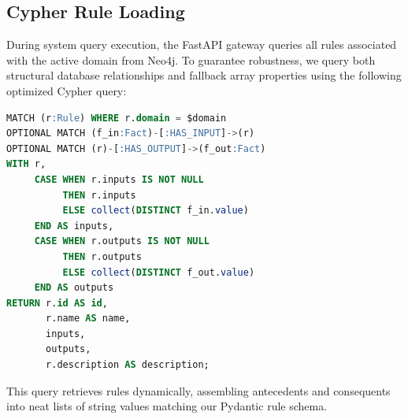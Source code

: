 \subsection{Cypher Rule Loading}
During system query execution, the FastAPI gateway queries all rules associated with the active domain from Neo4j. To guarantee robustness, we query both structural database relationships and fallback array properties using the following optimized Cypher query:

\begin{lstlisting}[language=SQL, style=jsonstyle, caption={Cypher query executed by the backend to retrieve domain rules and their connected input/output facts.}]
MATCH (r:Rule) WHERE r.domain = $domain
OPTIONAL MATCH (f_in:Fact)-[:HAS_INPUT]->(r)
OPTIONAL MATCH (r)-[:HAS_OUTPUT]->(f_out:Fact)
WITH r, 
     CASE WHEN r.inputs IS NOT NULL 
          THEN r.inputs 
          ELSE collect(DISTINCT f_in.value) 
     END AS inputs,
     CASE WHEN r.outputs IS NOT NULL 
          THEN r.outputs 
          ELSE collect(DISTINCT f_out.value) 
     END AS outputs
RETURN r.id AS id, 
       r.name AS name, 
       inputs, 
       outputs, 
       r.description AS description;
\end{lstlisting}
This query retrieves rules dynamically, assembling antecedents and consequents into neat lists of string values matching our Pydantic rule schema.
